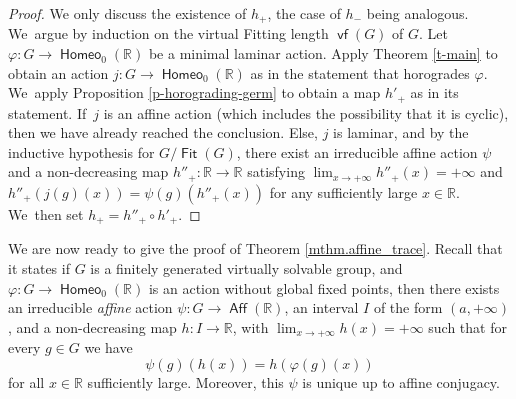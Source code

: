 \documentclass[JEP,XML,SOM,Unicode,NoFloatCountersInSection,published]{cedram}
\theoremstyle{definition}
\DeclareMathOperator{\Aff}{\mathsf{Aff}}
\DeclareMathOperator{\Fit}{\mathsf{Fit}}
\DeclareMathOperator{\homeo}{\mathsf{Homeo}}
\DeclareMathOperator{\vf}{\mathsf{vf}}
\newcommand{\R}{\mathbb{R}}
\begin{document}
\begin{proof}
We only discuss the existence of $h_+$, the case of $h_-$ being analogous. We~argue by induction on the virtual Fitting length $\vf(G)$ of $G$. Let $\varphi\colon G\to \homeo_0(\R)$ be a minimal laminar action. Apply Theorem \ref{t-main} to obtain an action $j\colon G\to \homeo_0(\R)$ as in the statement that horogrades $\varphi$. We~apply Proposition \ref{p-horograding-germ} to obtain a map $h'_+$ as in its statement. If~$j$ is an affine action (which includes the possibility that it is cyclic), then we have already reached the conclusion. Else, $j$ is laminar, and by the inductive hypothesis for $G/\Fit(G)$, there exist an irreducible affine action $\psi$ and a non-decreasing map $h''_+\colon \R\to \R$ satisfying $\lim_{x\to +\infty} h''_+(x)=+\infty$ and $h''_+(j(g)(x))=\psi(g) (h''_+(x))$ for any sufficiently large $x\in \R$. We~then set $h_+=h''_+\circ h'_+$.
\end{proof}

We are now ready to give the proof of Theorem \ref{mthm.affine_trace}. Recall that it states if $G$ is a finitely generated virtually solvable group, and $\varphi\colon G\to \homeo_0(\R)$ is an action without global fixed points, then there exists an irreducible {\em affine} action $\psi\colon G\to \Aff(\R)$, an interval $I$ of the form $(a,+\infty)$, and a non-decreasing map $h\colon I\to \R$, with $\lim_{x\to +\infty} h(x)=+\infty$ such that for every $g\in G$ we have
\[
\psi(g)(h(x))= h(\varphi(g)(x))
\]
for all $x\in \R$ sufficiently large. Moreover, this $\psi$ is unique up to affine conjugacy.
\end{document}
